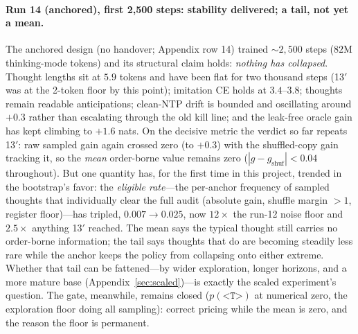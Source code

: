 \documentclass{article} %
\newcommand{\tstart}{\texttt{<T>}}
\begin{document}
\paragraph{Run 14 (anchored), first 2{,}500 steps: stability delivered; a tail, not yet a mean.} The anchored design (no handover; Appendix row 14) trained ${\sim}2{,}500$ steps ($82$M thinking-mode tokens) and its structural claim holds: \emph{nothing has collapsed}. Thought lengths sit at $5.9$ tokens and have been flat for two thousand steps (13$'$ was at the 2-token floor by this point); imitation CE holds at $3.4$--$3.8$; thoughts remain readable anticipations; clean-NTP drift is bounded and oscillating around $+0.3$ rather than escalating through the old kill line; and the leak-free oracle gain has kept climbing to $+1.6$ nats. On the decisive metric the verdict so far repeats 13$'$: raw sampled gain again crossed zero (to $+0.3$) with the shuffled-copy gain tracking it, so the \emph{mean} order-borne value remains zero ($|g - g_{\mathrm{shuf}}| < 0.04$ throughout). But one quantity has, for the first time in this project, trended in the bootstrap's favor: the \emph{eligible rate}---the per-anchor frequency of sampled thoughts that individually clear the full audit (absolute gain, shuffle margin $>1$, register floor)---has tripled, $0.007 \to 0.025$, now $12\times$ the run-12 noise floor and $2.5\times$ anything 13$'$ reached. The mean says the typical thought still carries no order-borne information; the tail says thoughts that do are becoming steadily less rare while the anchor keeps the policy from collapsing onto either extreme. Whether that tail can be fattened---by wider exploration, longer horizons, and a more mature base (Appendix~\ref{sec:scaled})---is exactly the scaled experiment's question. The gate, meanwhile, remains closed ($p(\tstart)$ at numerical zero, the exploration floor doing all sampling): correct pricing while the mean is zero, and the reason the floor is permanent.
\end{document}
